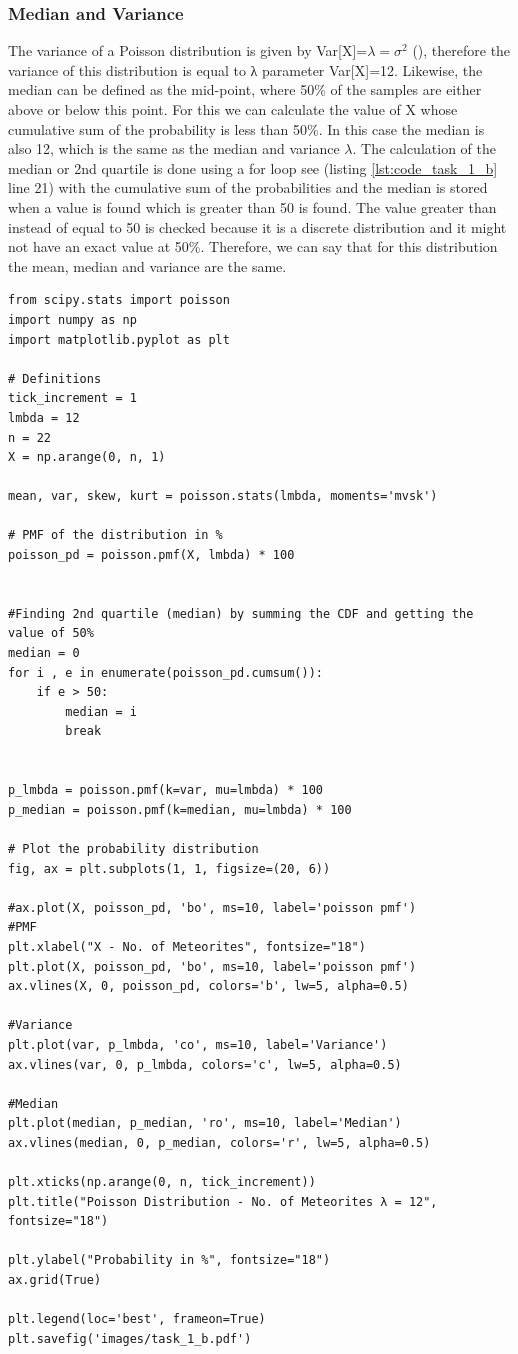 \subsubsection{Median and Variance}
The variance of a Poisson distribution is given by Var[X]=$\lambda=\sigma^2$ (\cite{hogg:2005}), therefore the variance of this distribution is equal to λ parameter Var[X]=12.
Likewise, the median can be defined as the mid-point, where 50\% of the samples are either above or below this point. For this we can calculate the value of X whose cumulative sum of the probability is less than 50\%. In this case the median is also 12, which is the same as the median and variance $\lambda$. The calculation of the median or 2nd quartile is done using a for loop see (listing \ref{lst:code_task_1_b} line 21)  with the cumulative sum of the probabilities and the median is stored when a value is found which is greater than 50 is found. The value greater than instead of equal to 50 is checked because it is a discrete distribution and it might not have an exact value at 50\%. Therefore, we can say that for this distribution the mean, median and variance are the same.

\begin{lstlisting}[caption={Plotting the PMF for Poisson Distribution)},label={lst:code_task_1_b}]
from scipy.stats import poisson
import numpy as np
import matplotlib.pyplot as plt

# Definitions
tick_increment = 1
lmbda = 12
n = 22
X = np.arange(0, n, 1)

mean, var, skew, kurt = poisson.stats(lmbda, moments='mvsk')

# PMF of the distribution in %
poisson_pd = poisson.pmf(X, lmbda) * 100


#Finding 2nd quartile (median) by summing the CDF and getting the value of 50%
median = 0
for i , e in enumerate(poisson_pd.cumsum()):
    if e > 50:
        median = i
        break


p_lmbda = poisson.pmf(k=var, mu=lmbda) * 100
p_median = poisson.pmf(k=median, mu=lmbda) * 100

# Plot the probability distribution
fig, ax = plt.subplots(1, 1, figsize=(20, 6))

#ax.plot(X, poisson_pd, 'bo', ms=10, label='poisson pmf')
#PMF
plt.xlabel("X - No. of Meteorites", fontsize="18")
plt.plot(X, poisson_pd, 'bo', ms=10, label='poisson pmf')
ax.vlines(X, 0, poisson_pd, colors='b', lw=5, alpha=0.5)

#Variance
plt.plot(var, p_lmbda, 'co', ms=10, label='Variance')
ax.vlines(var, 0, p_lmbda, colors='c', lw=5, alpha=0.5)

#Median
plt.plot(median, p_median, 'ro', ms=10, label='Median')
ax.vlines(median, 0, p_median, colors='r', lw=5, alpha=0.5)

plt.xticks(np.arange(0, n, tick_increment))
plt.title("Poisson Distribution - No. of Meteorites λ = 12", fontsize="18")

plt.ylabel("Probability in %", fontsize="18")
ax.grid(True)

plt.legend(loc='best', frameon=True)
plt.savefig('images/task_1_b.pdf')

\end{lstlisting}

